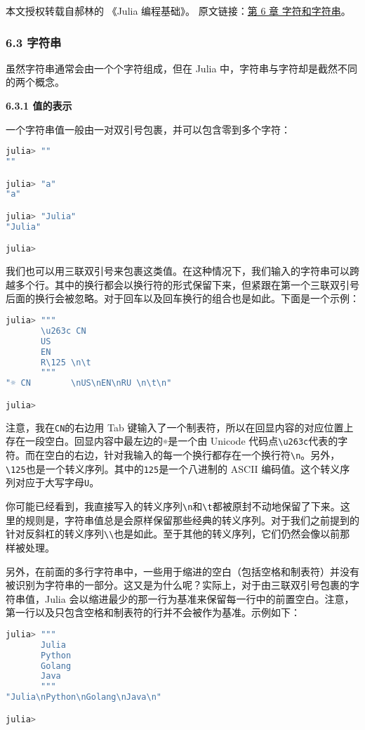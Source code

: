 
本文授权转载自郝林的 《Julia 编程基础》。 原文链接：\href{https://github.com/hyper0x/JuliaBasics/blob/master/book/ch06.md}{第 6 章 字符和字符串}。


\subsubsection{6.3 字符串}

虽然字符串通常会由一个个字符组成，但在 Julia 中，字符串与字符却是截然不同的两个概念。

\textbf{6.3.1 值的表示}

一个字符串值一般由一对双引号包裹，并可以包含零到多个字符：
\begin{lstlisting}[language=julia]
julia> ""
""

julia> "a"
"a"

julia> "Julia"
"Julia"

julia> 
\end{lstlisting}

我们也可以用三联双引号来包裹这类值。在这种情况下，我们输入的字符串可以跨越多个行。其中的换行都会以换行符的形式保留下来，但紧跟在第一个三联双引号后面的换行会被忽略。对于回车以及回车换行的组合也是如此。下面是一个示例：
\begin{lstlisting}[language=julia]
julia> """
       \u263c CN        
       US
       EN
       R\125 \n\t
       """
"☼ CN        \nUS\nEN\nRU \n\t\n"

julia> 
\end{lstlisting}

注意，我在\verb|CN|的右边用 Tab 键输入了一个制表符，所以在回显内容的对应位置上存在一段空白。回显内容中最左边的\verb|☼|是一个由 Unicode 代码点\verb|\u263c|代表的字符。而在空白的右边，针对我输入的每一个换行都存在一个换行符\verb|\n|。另外，\verb|\125|也是一个转义序列。其中的\verb|125|是一个八进制的 ASCII 编码值。这个转义序列对应于大写字母\verb|U|。

你可能已经看到，我直接写入的转义序列\verb|\n|和\verb|\t|都被原封不动地保留了下来。这里的规则是，字符串值总是会原样保留那些经典的转义序列。对于我们之前提到的针对反斜杠的转义序列\verb|\\|也是如此。至于其他的转义序列，它们仍然会像以前那样被处理。

另外，在前面的多行字符串中，一些用于缩进的空白（包括空格和制表符）并没有被识别为字符串的一部分。这又是为什么呢？实际上，对于由三联双引号包裹的字符串值，Julia 会以缩进最少的那一行为基准来保留每一行中的前置空白。注意，第一行以及只包含空格和制表符的行并不会被作为基准。示例如下：
\begin{lstlisting}[language=julia]
julia> """
       Julia
       Python
       Golang
       Java
       """
"Julia\nPython\nGolang\nJava\n"

julia> 
\end{lstlisting}

